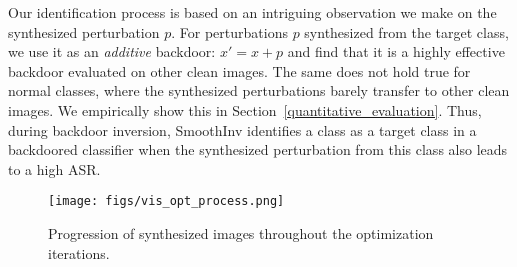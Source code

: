 \documentclass[10pt,twocolumn,letterpaper]{article}
\begin{document}
Our identification process is based on an intriguing observation we make on the synthesized perturbation $p$. For perturbations $p$ synthesized from the target class, we use it as an \textit{additive} backdoor: $x'=x+p$ and find that it is a highly effective backdoor evaluated on other clean images. The same does not hold true for normal classes, where the synthesized perturbations barely transfer to other clean images. We empirically show this in Section~\ref{quantitative_evaluation}. Thus, during backdoor inversion, SmoothInv identifies a class as a target class in a backdoored classifier when the synthesized perturbation from this class also leads to a high ASR.


\begin{figure}[!t]
\centering 
        \texttt{[image: figs/vis\_opt\_process.png]}
    \caption{Progression of synthesized images throughout the optimization iterations.}
    \label{fig:opt_process}
\end{figure}

    
\end{document}
